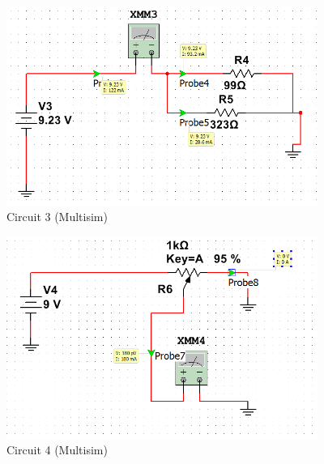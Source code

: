 \documentclass[12pt]{article}
\begin{document}
\begin{figure}[h!] %
   \centering
   \includegraphics[width=4in]{Circuit_3.PNG} 
   \caption{Circuit 3 (Multisim)}
   \label{fig:example}
\end{figure}

\newpage

\begin{figure}[h!] %
   \centering
   \includegraphics[width=4in]{Circuit_4.PNG} 
   \caption{Circuit 4 (Multisim)}
   \label{fig:example}
\end{figure}
\end{document}

